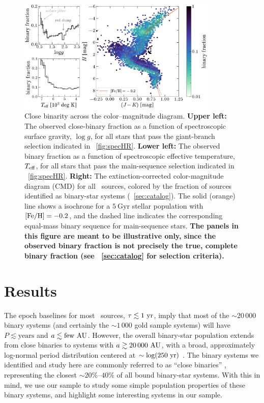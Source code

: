 \documentclass[modern]{aastex63}
\newcommand{\changes}[1]{{\bf\color{purple}#1}}
\begin{document}
\begin{figure}[!t]
    \begin{center}
    \includegraphics[width=0.85\textwidth]{binary-fraction.pdf}
    \end{center}
    \caption{%
    Close binarity across the color--magnitude diagram.
    \textbf{Upper left:} The observed close-binary fraction as a function of
    spectroscopic surface gravity, $\log g$, for all stars that pass the
    giant-branch selection indicated in \figurename~\ref{fig:specHR}.
    \textbf{Lower left:} The observed binary fraction as a function of
    spectroscopic effective temperature, $T_{\rm eff}$, for all stars that pass
    the main-sequence selection indicated in \figurename~\ref{fig:specHR}.
    \textbf{Right:} The extinction-corrected  color-magnitude
    diagram (CMD) for all \apogee\ sources, colored by the fraction of sources
    identified as binary-star systems (\sectionname~\ref{sec:catalog}).
    The solid (orange) line shows a  isochrone for a
    $5~\mathrm{Gyr}$ stellar population with ${[{\rm Fe}/{\rm H}]} = -0.2$, and the dashed line
    indicates the corresponding equal-mass binary sequence for main-sequence
    stars.
    \changes{The panels in this figure are meant to be illustrative only, since
    the observed binary fraction is not precisely the true, complete binary
    fraction (see \sectionname~\ref{sec:catalog} for selection criteria).}
    \label{fig:binary-CMD}
    }
\end{figure}


\section{Results} \label{sec:results}

The epoch baselines for most \apogee\ sources, $\tau \lesssim 1~\mathrm{yr}$, imply that
most of the $\sim 20\,000$ binary systems (and certainly the $\sim 1\,000$ gold
sample systems) will have $P \lesssim \mathrm{years}$ and $a \lesssim
\mathrm{few}~\mathrm{AU}$.
However, the overall binary-star population extends from close binaries to
systems with $a\gtrsim 20\,000~\mathrm{AU}$, with a broad, approximately log-normal
period distribution centered at $\sim \log(250~\mathrm{yr})$ \citep{Raghavan:2010}.
The binary systems we identified and study here are commonly referred to as
``close binaries'' \citep{Badenes:2018, Moe:2018}, representing the closest
$\sim 20\%$--$40\%$ of all bound binary-star systems.
With this in mind, we use our sample to study some simple population properties
of these binary systems, and highlight some interesting systems in our sample.
\end{document}
